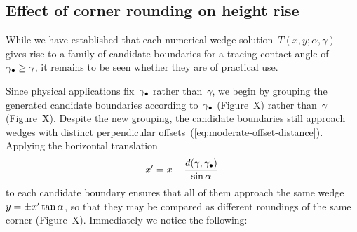 \subsection{Effect of corner rounding on height rise}
\label{sec:moderate.multiple.effect}

While we have established that
each numerical wedge solution~$T (x, y; \alpha, \gamma)$
gives rise to a family of candidate boundaries
for a tracing contact angle of~$\gamma_\bullet \ge \gamma$,
it remains to be seen whether they are of practical use.

Since physical applications fix~$\gamma_\bullet$ rather than~$\gamma$,
we begin by grouping the generated candidate boundaries
according to~$\gamma_\bullet$
(Figure~X) %
rather than~$\gamma$
(Figure~X). %
Despite the new grouping,
the candidate boundaries still approach wedges
with distinct perpendicular offsets~(\ref{eq:moderate-offset-distance}).
Applying the horizontal translation
\begin{equation}
  x' = x - \frac{d (\gamma, \gamma_\bullet)}{\sin\alpha}
  \label{eq:moderate-horizontal-translation}
\end{equation}
to each candidate boundary
ensures that all of them approach
the same wedge~$y = \pm x' \tan\alpha$,
so that they may be compared as different roundings
of the same corner
(Figure~X). %
Immediately we notice the following:
